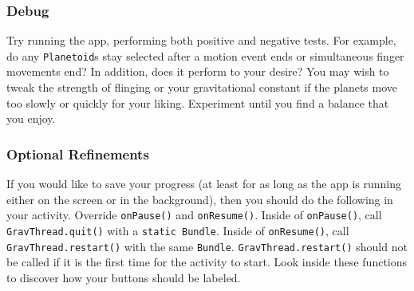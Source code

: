 \subsubsection{Debug}
Try running the app, performing both positive and negative tests.
For example, do any \verb=Planetoid=s stay selected after a motion event ends or simultaneous finger movements end?
In addition, does it perform to your desire?
You may wish to tweak the strength of flinging or your gravitational constant if the planets move too slowly or quickly for your liking.
Experiment until you find a balance that you enjoy.

\subsubsection{Optional Refinements}
If you would like to save your progress (at least for as long as the app is running either on the screen or in the background), then you should do the following in your activity.
Override \verb=onPause()= and \verb=onResume()=. 
Inside of \verb=onPause()=, call \verb=GravThread.quit()= with a \verb=static Bundle=. 
Inside of \verb=onResume()=, call \verb=GravThread.restart()= with the same \verb=Bundle=.
\verb=GravThread.restart()= should not be called if it is the first time for the activity to start.
Look inside these functions to discover how your buttons should be labeled.